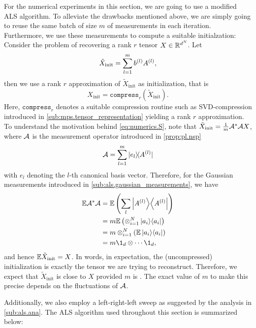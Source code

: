 For the numerical experiments in this section, we are going to use a modified ALS algorithm.
To alleviate the drawbacks mentioned above, we are simply going to reuse the same batch of size $m$ of measurements in each iteration.
Furthermore, we use these measurements to compute a suitable initialzation:
Consider the problem of recovering a rank $r$ tensor $X \in \Reals^{d^N}$.
Let
\[
  \label{eq:numerics.S}
  \tilde X_\mathrm{init} = \sum_{l=1}^m b\ind{l} A\ind{l},
\]
then we use a rank $r$ approximation of $\tilde X_\mathrm{init}$ as initialization, that is
\[
  \label{eq:numerics.Xinit}
  X_\mathrm{init} = \mathtt{compress}_r(\tilde X_\mathrm{init}).
\]
Here, $\mathtt{compress}_r$ denotes a suitable compression routine such as SVD-compression introduced in \cref{sub:mps.tensor_representation} yielding a rank $r$ approximation.
To understand the motivation behind \cref{eq:numerics.S}, note that $\tilde X_\mathrm{init} = \frac{1}{m} \adj{\AA}\AA X$, where $\AA$ is the measurement operator introduced in \cref{prop:pl.nsp}
\[
  \AA = \sum_{l=1}^m \ket{e_l}\bra{A\ind{l}}
\]
with $e_l$ denoting the $l$-th canonical basis vector.
Therefore, for the Gaussian measurements introduced in \cref{sub:als.gaussian_measurements}, we have
\begin{align}
  \Exp \adj{\AA}\AA
  &= \Exp \left( \sum_l \Ketbra{A\ind{l}} \right) \\
  &= m \Exp\left( \otimes_{i=1}^N \Ketbra{a_i} \right) \\
  &= m \otimes_{i=1}^N \left( \Exp \Ketbra{a_i} \right) \\
  &= m \1_d \otimes \cdots \1_d,
\end{align}
and hence $\Exp \tilde X_\mathrm{init} = X$.
In words, in expectation, the (uncompressed) initialization is exactly the tensor we are trying to reconstruct.
Therefore, we expect that $\tilde X_\mathrm{init}$ is close to $X$ provided $m$ is .
The exact value of $m$ to make this precise depends on the fluctuations of $\AA$.

Additionally, we also employ a left-right-left sweep as suggested by the analysis in \cref{sub:als.ana}.
The  ALS algorithm used throughout this section is summarized below:

